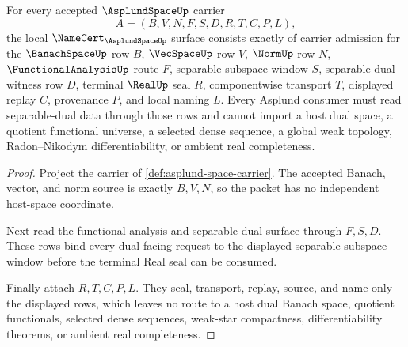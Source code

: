 \begin{theorem}
\label{thm:asplund-space-namecert-obligations}
For every accepted $\AsplundSpaceUp$ carrier
$$
A=(B,V,N,F,S,D,R,T,C,P,L),
$$
the local $\NameCert_{\AsplundSpaceUp}$ surface consists exactly of carrier admission for the $\BanachSpaceUp$ row $B$, $\VecSpaceUp$ row $V$, $\NormUp$ row $N$, $\FunctionalAnalysisUp$ route $F$, separable-subspace window $S$, separable-dual witness row $D$, terminal $\RealUp$ seal $R$, componentwise transport $T$, displayed replay $C$, provenance $P$, and local naming $L$. Every Asplund consumer must read separable-dual data through those rows and cannot import a host dual space, a quotient functional universe, a selected dense sequence, a global weak topology, Radon--Nikodym differentiability, or ambient real completeness.
\end{theorem}
\begin{proof}
Project the carrier of \autoref{def:asplund-space-carrier}. The accepted Banach, vector, and norm source is exactly $B,V,N$, so the packet has no independent host-space coordinate.

Next read the functional-analysis and separable-dual surface through $F,S,D$. These rows bind every dual-facing request to the displayed separable-subspace window before the terminal Real seal can be consumed.

Finally attach $R,T,C,P,L$. They seal, transport, replay, source, and name only the displayed rows, which leaves no route to a host dual Banach space, quotient functionals, selected dense sequences, weak-star compactness, differentiability theorems, or ambient real completeness.
\end{proof}

